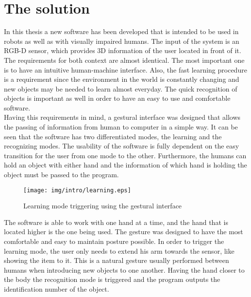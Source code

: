 \section{The solution}

In this thesis a new software has been developed that is intended to be used in robots as well as with visually impaired humans. The input of the system is an RGB-D sensor, which provides 3D information of the user located in front of it. 
\\

The requirements for both context are almost identical. The most important one is to have an intuitive human-machine interface. Also, the fast learning procedure is a requirement since the environment in the world is constantly changing and new objects may be needed to learn almost everyday. The quick recognition of objects is important as well in order to have an easy to use and comfortable software. 
\\

Having this requirements in mind, a gestural interface was designed that allows the passing of information from human to computer in a simple way. It can be seen that the software has two differentiated modes, the learning and the recognizing modes. The usability of the software is fully dependent on the easy transition for the user from one mode to the other. 
Furthermore, the humans can hold an object with either hand and the information of which hand is holding the object must be passed to the program. 

\vspace*{0.5cm}
\begin{figure}[H]
	\centering
    \texttt{[image: img/intro/learning.eps]}
	\caption[Learning Mode Triggering]{Learning mode triggering using the gestural interface}
\end{figure}
\vspace*{0.5cm}

The software is able to work with one hand at a time, and the hand that is located higher is the one being used. The gesture was designed to have the most comfortable and easy to maintain posture possible. In order to trigger the learning mode, the user only needs to extend his arm towards the sensor, like showing the item to it. This is a natural gesture usually performed between humans when introducing new objects to one another. Having the hand closer to the body the recognition mode is triggered and the program outputs the identification number of the object. 

